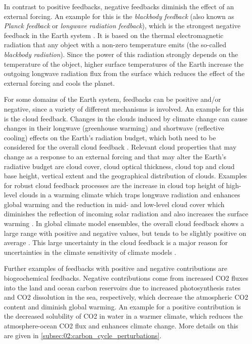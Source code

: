 In contrast to positive feedbacks, negative feedbacks diminish the effect of an
external forcing. An example for this is the \emph{blackbody feedback} (also
known as \emph{Planck feedback} or \emph{longwave radiation feedback}), which
is the strongest negative feedback in the Earth system \autocite{Cubasch2013}.
It is based on the thermal electromagnetic radiation that any object with a
non-zero temperature emits (the so-called \emph{blackbody radiation}). Since
the power of this radiation strongly depends on the temperature of the object,
higher surface temperatures of the Earth increase the outgoing longwave
radiation flux from the surface which reduces the effect of the external
forcing and cools the planet.

For some domains of the Earth system, feedbacks can be positive and/or
negative, since a variety of different mechanisms is involved. An example for
this is the cloud feedback. Changes in the clouds induced by climate change can
cause changes in their longwave (greenhouse warming) and shortwave (reflective
cooling) effects on the Earth's radiation budget, which both need to be
considered for the overall cloud feedback \autocite{Boucher2013}. Relevant
cloud properties that may change as a response to an external forcing and that
may alter the Earth's radiative budget are cloud cover, cloud optical
thickness, cloud top and cloud base height, vertical extent and the
geographical distribution of clouds. Examples for robust cloud feedback
processes are the increase in cloud top height of high-level clouds in a
warming climate which traps longwave radiation and enhances global warming and
the reduction in mid- and low-level cloud cover which diminishes the reflection
of incoming solar radiation and also increases the surface warming
\autocite{Boucher2013}. In global climate model ensembles, the overall cloud
feedback shows a large range with positive and negative values, but tends to be
slightly positive on average \autocite{Soden2006, Dufresne2008, Vial2013,
  Zelinka2020}. This large uncertainty in the cloud feedback is a major reason
for uncertainties in the climate sensitivity of climate models
\autocite{Boucher2013, Flato2013}.

Further examples of feedbacks with positive and negative contributions are
biogeochemical feedbacks. Negative contributions come from increased \ac{CO2}
fluxes into the land and ocean carbon reservoirs due to increased
photosynthesis rates and \ac{CO2} dissolution in the sea, respectively, which
decrease the atmospheric \ac{CO2} content and diminish global warming. An
example for a positive contribution is the decreased solubility of \ac{CO2} in
water in a warmer climate, which reduces the atmosphere-ocean \ac{CO2} flux and
enhances climate change. More details on this are given in
\cref{subsec:02:carbon_cycle_perturbations}.


